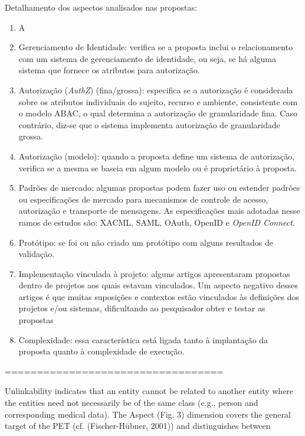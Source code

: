 Detalhamento dos aspectos analisados nas propostas:
\begin{enumerate}
	\item A
	\item Gerenciamento de Identidade: verifica se a proposta inclui o relacionamento com um sistema de gerenciamento de identidade, ou seja, se há alguma sistema que fornece os atributos para autorização.
	\item Autorização (\textit{AuthZ}) (fina/grossa): especifica se a autorização é considerada sobre os atributos individuais do sujeito, recurso e ambiente, consistente com o modelo ABAC, o qual determina a autorização de granularidade fina. Caso contrário, diz-se que o sistema implementa autorização de granularidade grossa.
	\item Autorização (modelo): quando a proposta define um sistema de autorização, verifica se a mesma se baseia em algum modelo ou é proprietário à proposta.
	\item Padrões de mercado: algumas propostas podem fazer uso ou estender padrões ou especificações de mercado para mecanismos de controle de acesso, autorização e transporte de mensagens. As especificações mais adotadas nesse ramos de estudos são: XACML, SAML, OAuth, OpenID e \textit{OpenID Connect}.
	\item Protótipo: se foi ou não criado um protótipo com alguns resultados de validação.
	\item Implementação vinculada à projeto: alguns artigos apresentaram propostas dentro de projetos aos quais estavam vinculados. Um aspecto negativo desses artigos é que muitas suposições e contextos estão vinculados às definições dos projetos e/ou sistemas, dificultando ao pesquisador obter e testar as propostas
	\item Complexidade: essa característica está ligada tanto à implantação da proposta quanto à complexidade de execução.	
\end{enumerate}


==================================

Unlinkability indicates that an entity cannot be related to
another entity where the entities need not necessarily be of
the same class (e.g., person and corresponding medical data).
The Aspect (Fig. 3) dimension covers the general target of the
PET (cf. (Fischer-Hübner, 2001)) and distinguishes between

